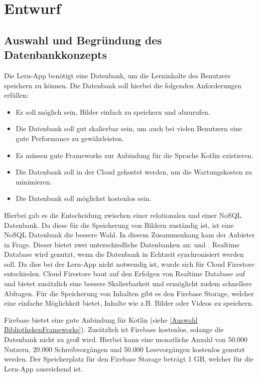 \section{Entwurf}
\subsection{Auswahl und Begründung des Datenbankkonzepts}
Die Lern-App  benötigt eine Datenbank, um die Lerninhalte des Benutzers speichern zu können. Die Datenbank soll hierbei die folgenden Anforderungen erfüllen:
\begin{itemize}
    \item Es soll möglich sein, Bilder einfach zu speichern und abzurufen.
    \item Die Datenbank soll gut skalierbar sein, um auch bei vielen Benutzern eine gute Performance zu gewährleisten.
    \item Es müssen gute Frameworks zur Anbindung für die Sprache Kotlin existieren.
    \item Die Datenbank soll in der Cloud gehostet werden, um die Wartungskosten zu minimieren.
    \item Die Datenbank soll möglichst kostenlos sein.
\end{itemize}

\noindent
Hierbei gab es die Entscheidung zwischen einer relationalen und einer NoSQL Datenbank. Da diese für die Speicherung von Bildern zuständig ist, ist eine NoSQL Datenbank die bessere Wahl. In diesem Zusammenhang kam der Anbieter  in Frage. Dieser bietet zwei unterschiedliche Datenbanken an:  und . Realtime Database wird genutzt, wenn die Datenbank in Echtzeit synchronisiert werden soll. Da dies bei der Lern-App nicht notwendig ist, wurde sich für Cloud Firestore entschieden. Cloud Firestore baut auf den Erfolgen von Realtime Database auf und bietet zusätzlich eine bessere Skalierbarkeit und ermöglicht zudem schnellere Abfragen. \cite*{Firestore} Für die Speicherung von Inhalten gibt es den Firebase Storage, welcher eine einfache Möglichkeit bietet, Inhalte wie z.B. Bilder oder Videos zu speichern. \newline

\noindent
Firebase bietet eine gute Anbindung für Kotlin (siehe \ref*{Auswahl BibliothekenFrameworks}). Zusätzlich ist Firebase kostenlos, solange die Datenbank nicht zu groß wird. Hierbei kann eine monatliche Anzahl von 50.000 Nutzern, 20.000 Schreibvorgängen und 50.000 Lesevorgängen kostenlos genutzt werden. Der Speicherplatz für den Firebase Storage beträgt 1 GB, welcher für die Lern-App ausreichend ist. \cite*{Firebase_Pricing}

